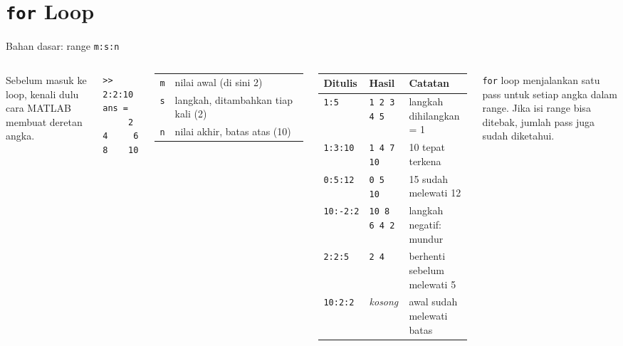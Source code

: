\documentclass[aspectratio=169,11pt]{beamer}
\begin{document}
\section{\texttt{for} Loop}

\begin{frame}[fragile]{Bahan dasar: range \texttt{m:s:n}}
\begin{columns}[T]
\small Sebelum masuk ke loop, kenali dulu cara MATLAB membuat deretan angka.
\begin{lstlisting}[basicstyle=\ttfamily\footnotesize]
>> 2:2:10
ans =
     2     4     6     8    10
\end{lstlisting}
\footnotesize
\renewcommand{\arraystretch}{1.15}
\begin{tabular}{l l}
\texttt{m} & nilai awal (di sini 2) \\
\texttt{s} & langkah, ditambahkan tiap kali (2) \\
\texttt{n} & nilai akhir, batas atas (10) \\
\end{tabular}
\footnotesize
\renewcommand{\arraystretch}{1.15}
\begin{tabular}{l l l}
\toprule
Ditulis & Hasil & Catatan \\
\midrule
\texttt{1:5} & \texttt{1 2 3 4 5} & langkah dihilangkan = 1 \\
\texttt{1:3:10} & \texttt{1 4 7 10} & 10 tepat terkena \\
\texttt{0:5:12} & \texttt{0 5 10} & 15 sudah melewati 12 \\
\texttt{10:-2:2} & \texttt{10 8 6 4 2} & langkah negatif: mundur \\
\texttt{2:2:5} & \texttt{2 4} & berhenti sebelum melewati 5 \\
\texttt{10:2:2} & \textit{kosong} & awal sudah melewati batas \\
\bottomrule
\end{tabular}

\vspace{0.6em}
\small \texttt{for} loop menjalankan \alert{satu pass untuk setiap angka}
dalam range. Jika isi range bisa ditebak, jumlah pass juga sudah diketahui.
\end{columns}
\end{frame}
\end{document}
